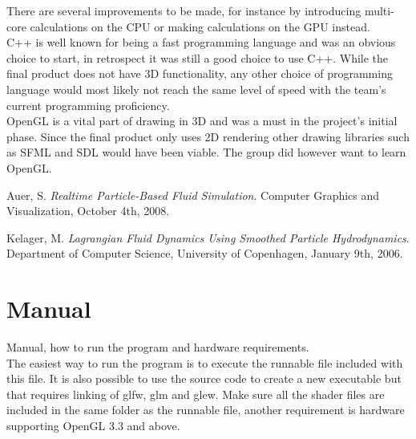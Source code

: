 \documentclass[a4paper,12pt,twoside,final]{report}
\begin{document}
\noindent There are several improvements to be made, for instance by introducing multi-core calculations on the CPU or making calculations on the GPU instead. \\

\noindent C++ is well known for being a fast programming language and was an obvious choice to start, in retrospect it was still a good choice to use C++. While the final product does not have 3D functionality, any other choice of programming language would most likely not reach the same level of speed with the team’s current programming proficiency. \\

\noindent OpenGL is a vital part of drawing in 3D and was a must in the project’s initial phase. Since the final product only uses 2D rendering other drawing libraries such as SFML and SDL would have been viable. The group did however want to learn OpenGL.




%
%



\begin{thebibliography}{11}

  Auer, S.
  \emph{Realtime Particle-Based Fluid Simulation}.
  Computer Graphics and Visualization,
  October 4th,
  2008.
  
  Kelager, M.
  \emph{Lagrangian Fluid Dynamics Using Smoothed Particle Hydrodynamics}.
  Department of Computer Science, University of Copenhagen,
  January 9th,
  2006.

\end{thebibliography}

\newpage


\appendix
\chapter{Manual}
Manual, how to run the program and hardware requirements. \\
\noindent The easiest way to run the program is to execute the runnable file included with this file. It is also possible to use the source code to create a new executable but that requires linking of glfw, glm and glew. Make sure all the shader files are included in the same folder as the runnable file, another requirement is hardware supporting OpenGL 3.3 and above.
\end{document}
